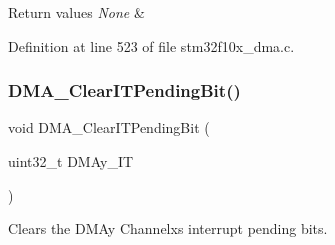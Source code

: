 \begin{DoxyRetVals}{Return values}
{\em None} & \\
\hline
\end{DoxyRetVals}


Definition at line 523 of file stm32f10x\+\_\+dma.\+c.

\mbox{\label{group___d_m_a___exported___functions_ga91a7340e5b334a942f3eb1e05ed5f67a}} 
\subsubsection{\texorpdfstring{D\+M\+A\+\_\+\+Clear\+I\+T\+Pending\+Bit()}{DMA\_ClearITPendingBit()}}
{\footnotesize\ttfamily void D\+M\+A\+\_\+\+Clear\+I\+T\+Pending\+Bit (\begin{DoxyParamCaption}\item[{uint32\+\_\+t}]{D\+M\+Ay\+\_\+\+IT }\end{DoxyParamCaption})}



Clears the D\+M\+Ay Channelx\textquotesingle{}s interrupt pending bits. 


